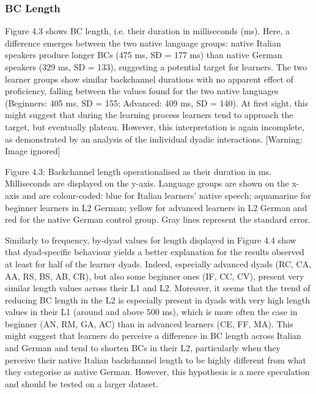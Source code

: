 \subsubsection[BC Length]{BC Length}
\hypertarget{Toc191305952}{}\begin{styleStandard}
Figure 4.3 shows BC length, i.e. their duration in milliseconds (ms). Here, a difference emerges between the two native language groups: native Italian speakers produce longer BCs (475 ms, SD = 177 ms) than native German speakers (329 ms, SD = 133), suggesting a potential target for learners. The two learner groups show similar backchannel durations with no apparent effect of proficiency, falling between the values found for the two native languages (Beginners: 405 ms, SD = 155; Advanced: 409 ms, SD = 140). At first sight, this might suggest that during the learning process learners tend to approach the target, but eventually plateau. However, this interpretation is again incomplete, as demonstrated by an analysis of the individual dyadic interactions.   [Warning: Image ignored] %
 
\end{styleStandard}

\begin{stylecaption}
Figure 4.3: Backchannel length operationalised as their duration in ms. Milliseconds are displayed on the y-axis. Language groups are shown on the x-axis and are colour-coded: blue for Italian learners’ native speech; aquamarine for beginner learners in L2 German; yellow for advanced learners in L2 German and red for the native German control group. Gray lines represent the standard error.
\end{stylecaption}

\begin{styleStandard}
Similarly to frequency, by-dyad values for length displayed in Figure 4.4 show that dyad-specific behaviour yields a better explanation for the results observed at least for half of the learner dyads. Indeed, especially advanced dyads (RC, CA, AA, RS, BS, AB, CR), but also some beginner ones (IF, CC, CV), present very similar length values across their L1 and L2. Moreover, it seems that the trend of reducing BC length in the L2 is especially present in dyads with very high length values in their L1 (around and above 500 ms), which is more often the case in beginner (AN, RM, GA, AC) than in advanced learners (CE, FF, MA). This might suggest that learners do perceive a difference in BC length across Italian and German and tend to shorten BCs in their L2, particularly when they perceive their native Italian backchannel length to be highly different from what they categorise as native German. However, this hypothesis is a mere speculation and should be tested on a larger dataset.
\end{styleStandard}

